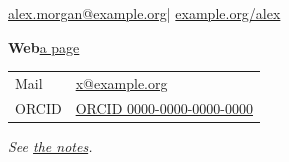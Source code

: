 \documentclass{article}
\newcommand{\contact}[2]{\noindent\textbf{#1}\quad #2\par}
\begin{document}
\begin{center}
\small\href{mailto:alex.morgan@example.org}{alex.morgan@example.org}\quad |\quad
\href{https://example.org/alex}{example.org/alex}
\end{center}
\contact{Web}{\href{https://example.org/a-b?page=1}{a page}}
\begin{tabular}{ll}
Mail & \href{mailto:x@example.org}{x@example.org} \\
ORCID & \href{https://orcid.org/0000-0000-0000-0000}{ORCID 0000-0000-0000-0000}
\end{tabular}

{\itshape See \href{https://example.org/notes}{the notes}.}
\end{document}
